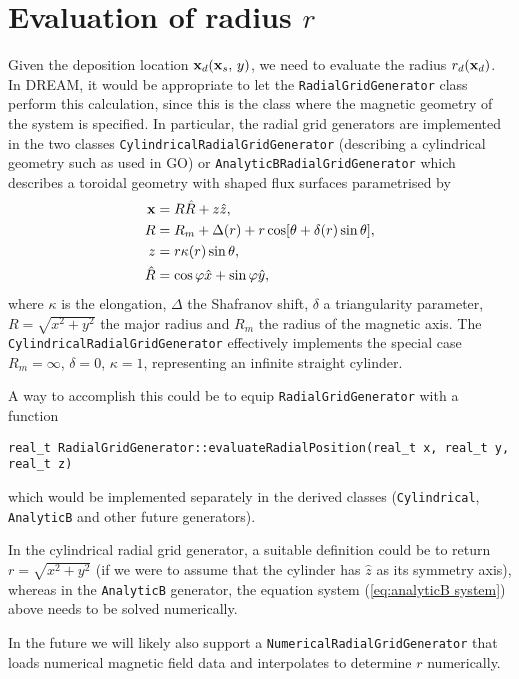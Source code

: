 \documentclass[11pt,a4paper]{article}
\renewcommand{\b}[1]{\ensuremath{ {\bf #1 } }}
\begin{document}
\section*{Evaluation of radius $r$}
Given the deposition location $\b{x}_d(\b{x}_s,\,y)$, we need to evaluate the radius $r_d(\b{x}_d)$. In DREAM, it would be appropriate to let the \texttt{RadialGridGenerator} class perform this calculation, since this is the class where the magnetic geometry of the system is specified.
In particular, the radial grid generators are implemented in the two classes \texttt{CylindricalRadialGridGenerator} (describing a cylindrical geometry such as used in GO) or \texttt{AnalyticBRadialGridGenerator} which describes a toroidal geometry with shaped flux surfaces parametrised by
\begin{align}
\b{x} &= R\hat{R} + z\hat{z}, \nonumber \\
R &= R_m + \Delta(r) + r\cos[\theta +\delta(r) \sin\theta], \nonumber \\
z &= r \kappa(r) \sin\theta, \nonumber \\
\hat{R} &= \cos\varphi \hat{x} + \sin\varphi \hat{y},
\label{eq:analyticB system}
\end{align}
where $\kappa$ is the elongation, $\Delta$ the Shafranov shift, $\delta$ a triangularity parameter, $R=\sqrt{x^2+y^2}$ the major radius and $R_m$ the radius of the magnetic axis. The \texttt{CylindricalRadialGridGenerator} effectively implements the special case $R_m=\infty$, $\delta=0$, $\kappa=1$, representing an infinite straight cylinder.

A way to accomplish this could be to equip \texttt{RadialGridGenerator} with a function
\begin{verbatim}
real_t RadialGridGenerator::evaluateRadialPosition(real_t x, real_t y, real_t z)
\end{verbatim}
which would be implemented separately in the derived classes (\texttt{Cylindrical}, \texttt{AnalyticB} and other future generators).

In the cylindrical radial grid generator, a suitable definition could be to return $r = \sqrt{x^2+y^2}$ (if we were to assume that the cylinder has $\hat{z}$ as its symmetry axis), whereas in the \texttt{AnalyticB} generator, the equation system (\ref{eq:analyticB system}) above needs to be solved numerically. 

In the future we will likely also support a \texttt{NumericalRadialGridGenerator} that loads numerical magnetic field data and interpolates to determine $r$ numerically.
\end{document}
